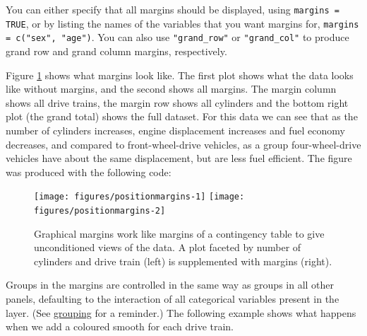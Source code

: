 You can either specify that all margins should be displayed, using
\texttt{margins = TRUE}, or by listing the names of the variables that
you want margins for, \texttt{margins = c("sex", "age")}. You can also
use \texttt{"grand\_row"} or \texttt{"grand\_col"} to produce grand row
and grand column margins, respectively.

Figure \ref{fig:margins} shows what margins look like. The first plot
shows what the data looks like without margins, and the second shows all
margins. The margin column shows all drive trains, the margin row shows
all cylinders and the bottom right plot (the grand total) shows the full
dataset. For this data we can see that as the number of cylinders
increases, engine displacement increases and fuel economy decreases, and
compared to front-wheel-drive vehicles, as a group four-wheel-drive
vehicles have about the same displacement, but are less fuel efficient.
The figure was produced with the following code:

\begin{Shaded}
\begin{Highlighting}[]
\StringTok{ } 
\StringTok{  }\NormalTok{(} \NormalTok{, } 
\StringTok{ }\StringTok{ }
\StringTok{ }\StringTok{ } 
\end{Highlighting}
\end{Shaded}

\begin{figure}

{\centering \texttt{[image: figures/positionmargins-1]} \texttt{[image: figures/positionmargins-2]} 

}

\caption{Graphical margins work like margins of a contingency table to give unconditioned views of the data.  A plot faceted by number of cylinders and drive train (left) is supplemented with margins (right).\label{fig:margins}}
\end{figure}

Groups in the margins are controlled in the same way as groups in all
other panels, defaulting to the interaction of all categorical variables
present in the layer. (See \hyperref[sub:grouping]{grouping} for a
reminder.) The following example shows what happens when we add a
coloured smooth for each drive train.


